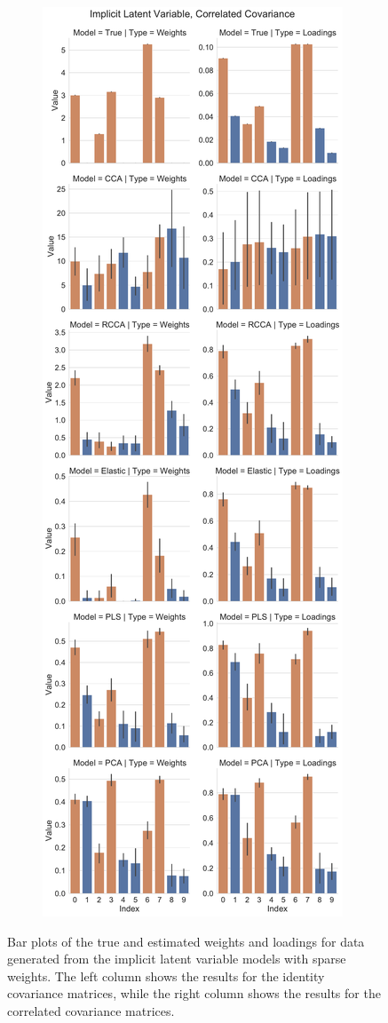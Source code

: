 \begin{figure}
\begin{subfigure}{0.49\linewidth}
\end{subfigure}
\begin{subfigure}{0.49\linewidth}
\centering
\includegraphics[width=\linewidth]{figures/simulated/implicit/Combined_Weights_Loadings_with_Error_Bars_Correlated}
\end{subfigure}
\caption{Bar plots of the true and estimated weights and \gls{loadings} for data generated from the implicit latent variable models with sparse weights. The left column shows the results for the identity covariance matrices, while the right column shows the results for the correlated covariance matrices.}\label{fig:implicit-weights-loadings}
\end{figure}

